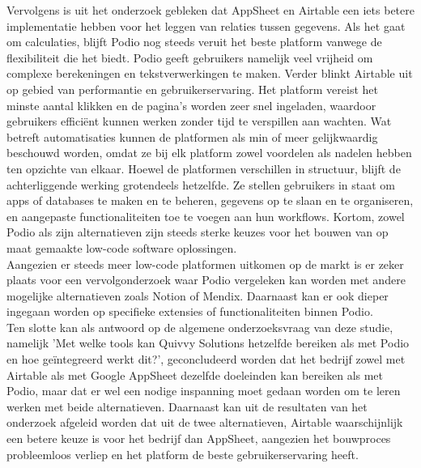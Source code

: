 Vervolgens is uit het onderzoek gebleken dat AppSheet en Airtable een iets betere implementatie hebben voor het leggen van relaties tussen gegevens. Als het gaat om calculaties, blijft Podio nog steeds veruit het beste platform vanwege de flexibiliteit die het biedt. Podio geeft gebruikers namelijk veel vrijheid om complexe berekeningen en tekstverwerkingen te maken. Verder blinkt Airtable uit op gebied van performantie en gebruikerservaring. Het platform vereist het minste aantal klikken en de pagina's worden zeer snel ingeladen, waardoor gebruikers efficiënt kunnen werken zonder tijd te verspillen aan wachten. Wat betreft automatisaties kunnen de platformen als min of meer gelijkwaardig beschouwd worden, omdat ze bij elk platform zowel voordelen als nadelen hebben ten opzichte van elkaar. Hoewel de platformen verschillen in structuur, blijft de achterliggende werking grotendeels hetzelfde. Ze stellen gebruikers in staat om apps of databases te maken en te beheren, gegevens op te slaan en te organiseren, en aangepaste functionaliteiten toe te voegen aan hun workflows. Kortom, zowel Podio als zijn alternatieven zijn steeds sterke keuzes voor het bouwen van op maat gemaakte low-code software oplossingen. \\

Aangezien er steeds meer low-code platformen uitkomen op de markt is er zeker plaats voor een vervolgonderzoek waar Podio vergeleken kan worden met andere mogelijke alternatieven zoals Notion of Mendix. Daarnaast kan er ook dieper ingegaan worden op specifieke extensies of functionaliteiten binnen Podio. \\ 

Ten slotte kan als antwoord op de algemene onderzoeksvraag van deze studie, namelijk 'Met welke tools kan Quivvy Solutions hetzelfde bereiken als met Podio en hoe geïntegreerd werkt dit?', geconcludeerd worden dat het bedrijf zowel met Airtable als met Google AppSheet dezelfde doeleinden kan bereiken als met Podio, maar dat er wel een nodige inspanning moet gedaan worden om te leren werken met beide alternatieven. Daarnaast kan uit de resultaten van het onderzoek afgeleid worden dat uit de twee alternatieven, Airtable waarschijnlijk een betere keuze is voor het bedrijf dan AppSheet, aangezien het bouwproces probleemloos verliep en het platform de beste gebruikerservaring heeft. \\ 